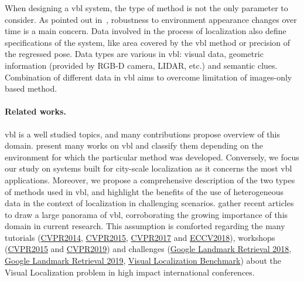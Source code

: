 		When designing a \ac{vbl} system, the type of method is not the only parameter to consider. As pointed out in~\citep{Lowry2016}, robustness to environment appearance changes over time is a main concern. Data involved in the process of localization also define specifications of the system, like area covered by the \ac{vbl} method or precision of the regressed pose.  Data types are various in \ac{vbl}: visual data, geometric information (provided by RGB-D camera, LIDAR, etc.) and semantic clues. Combination of different data in \ac{vbl} aims to overcome limitation of images-only based method.
		
	\paragraph{Related works.} 
    	\ac{vbl} is a well studied topics, and many contributions propose overview of this domain. \citet{Brejcha2017} present many works on \ac{vbl} and classify them depending on the environment for which the particular method was developed. Conversely, we focus our study on systems built for city-scale localization as it concerns the most \ac{vbl} applications. Moreover, we propose a comprehensive description of the two types of methods used in \ac{vbl}, and highlight the benefits of the use of heterogeneous data in the context of localization in challenging scenarios. \citet{Zamir2016} gather recent articles to draw a large panorama of \ac{vbl}, corroborating the growing importance of this domain in current research. This assumption is comforted regarding the many tutorials (\href{https://sites.google.com/site/lsvpr2014/}{CVPR2014}, \href{https://roboticvision.atlassian.net/wiki/display/PUB/CVPR+2015+Workshop+on+Visual+Place+Recognition+in+Changing+Environments}{CVPR2015}, \href{https://sites.google.com/view/lsvpr2017/home}{CVPR2017} and \href{https://sites.google.com/view/visual-localization-eccv-2018/home}{ECCV2018}), workshops (\href{https://roboticvision.atlassian.net/wiki/display/PUB/CVPR+2015+Workshop+on+Visual+Place+Recognition+in+Changing+Environments}{CVPR2015} and \href{https://sites.google.com/view/ltvl2019}{CVPR2019}) and challenges (\href{https://www.kaggle.com/c/landmark-retrieval-challenge}{Google Landmark Retrieval 2018}, \href{https://www.kaggle.com/c/landmark-retrieval-2019}{Google Landmark Retrieval 2019}, \href{https://www.visuallocalization.net/}{Visual Localization Benchmark}) about the Visual Localization problem in high impact international conferences.
    	
